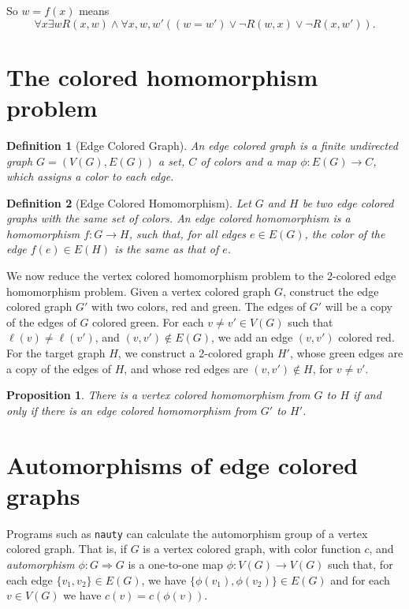 \documentclass{article}
\newtheorem{definition}{Definition}
\newtheorem{proposition}{Proposition}
\begin{document}
So $w=f(x)$ means
\begin{displaymath}
  \forall x \exists w R(x,w) \wedge \forall x,w,w' ((w = w') \vee
  \neg R(w,x) \vee \neg R(x,w')).
\end{displaymath}

\section{The colored homomorphism problem}
\label{sec:colored}

\begin{definition}[Edge Colored Graph]
  An \emph{edge colored graph} is a finite undirected graph $G =
  (V(G), E(G))$ a set, $C$ of colors and a map $\phi: E(G) \rightarrow
  C$, which assigns a color to each edge.
\end{definition}
\begin{definition}[Edge Colored Homomorphism]
Let $G$ and $H$ be two edge colored graphs with the same set of
colors.  An \emph{edge colored homomorphism} is a homomorphism $f : G
\rightarrow H$, such that, for all edges $e \in E(G)$, the color of
the edge $f(e) \in E(H)$ is the same as that of $e$.
\end{definition}

We now reduce the vertex colored homomorphism problem to the 2-colored
edge homomorphism problem.  Given a vertex colored graph $G$,
construct the edge colored graph $G'$ with two colors, red and green.
The edges of $G'$ will be a copy of the edges of $G$ colored green.
For each $v \ne v' \in V(G)$ such that $\ell(v) \ne \ell(v')$, and
$(v,v') \not \in E(G)$, we add an edge $(v,v')$ colored red.  For the
target graph $H$, we construct a 2-colored graph $H'$, whose green
edges are a copy of the edges of $H$, and whose red edges are
$(v,v') \not \in H$, for $v \ne v'$.
\begin{proposition}
  There is a vertex colored homomorphism from $G$ to $H$ if and only
  if there is an edge colored homomorphism from $G'$ to $H'$.
\end{proposition}

\section{Automorphisms of edge colored graphs}
\label{sec:automorphisms}

Programs such as {\tt nauty} can calculate the automorphism group of a
vertex colored graph.  That is, if $G$ is a vertex colored graph, with
color function $c$, and \emph{automorphism} $\phi: G \Rightarrow G$ is
a one-to-one map $\phi: V(G) \rightarrow V(G)$ such that, for each
edge $\{v_1, v_2\} \in E(G)$, we have $\{\phi(v_1), \phi(v_2)\} \in
E(G)$ and for each $v \in V(G)$ we have $c(v) = c(\phi(v))$.
\end{document}

